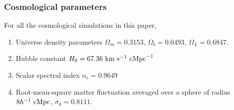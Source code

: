 \documentclass[
 reprint,
 superscriptaddress,
 nofootinbib,
 nobibnotes,
 amsmath,
 amssymb,
 aps,
 prd,
 floatfix,
 longbibliography
]{revtex4-1}
\begin{document}
\subsubsection{Cosmological parameters}
\label{subsub:cosmo_params}

For all the cosmological simulations in this paper,
\begin{enumerate}
    \item Universe density parameters $\Omega_m=0.3153$, $\Omega_b=0.0493$, $\Omega_L= 0.6847$.
    \item Hubble constant $H_0 = 67.36 \ \rm{km}\ \rm{s}^{-1}\ \rm{cMpc}^{-1}$
    \item Scalar spectral index $n_s = 0.9649$
    \item Root-mean-square matter fluctuation averaged over a sphere of radius $8 h^{-1}~\rm{cMpc}$, $\sigma_8 = 0.8111$.
\end{enumerate}
\end{document}
